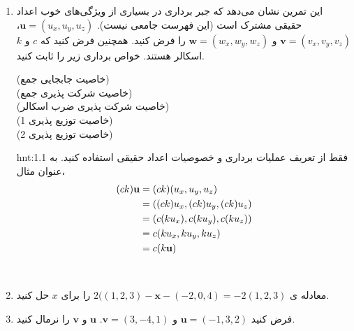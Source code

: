 {\begin{spacing}{1.5}
\begin{enumerate}[label=\textbf{\arabic*}.]
            \item {این تمرین نشان می‌دهد که جبر برداری در بسیاری از ویژگی‌های خوب اعداد حقیقی مشترک است (این فهرست جامعی نیست).
                $\textbf{u}=(u_{x},u_{y},u_{z})$، $\textbf{v}=(v_{x},v_{y},v_{z})$ و $\textbf{w}=(w_{x},w_{y},w_{z})$ را فرض کنید. همچنین فرض کنید که $c$ و $k$ اسکالر هستند. خواص برداری زیر را ثابت کنید.}
            \begin{flushleft}
            (خاصیت جابجایی جمع)
                 \\
                (خاصیت شرکت پذیری جمع)  \\
                (خاصیت شرکت پذیری ضرب اسکالر)  \\
                (خاصیت توزیع پذیری 1)  \\
                (خاصیت توزیع پذیری 2) 
            \end{flushleft}
            \begin{hint}{hnt:1.1}
                \Large
                فقط از تعریف عملیات برداری و خصوصیات اعداد حقیقی استفاده کنید.
                به عنوان مثال،
                \begin{equation*}
                    \centering
                    \begin{split}
                    (ck)
                        \textbf{u}&=(ck)(u_x,u_y,u_z)\\
                        &=((ck)u_x,(ck)u_y,(ck)u_z)\\
                        &=(c(ku_x),c(ku_y),c(ku_z))\\
                        &=c(ku_x,ku_y,ku_z)\\
                        &=c(k\textbf{u})
                    \end{split}
                \end{equation*}
            \end{hint} \\

            \item {معادله ی $2((1,2,3)-\textbf{x}-(-2,0,4)=-2(1,2,3)$ را برای $x$ حل کنید.}

            \item {فرض کنید $\textbf{u}=(-1,3,2)$ و $\textbf{v}=(3,-4,1)$. $\textbf{u}$ و $\textbf{v}$ را نرمال کنید.}


\end{enumerate}
\end{spacing}}
